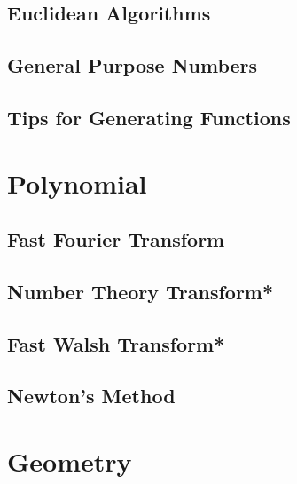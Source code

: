 \subsection{Euclidean Algorithms}

\subsection{General Purpose Numbers}

\subsection{Tips for Generating Functions}


\section{Polynomial}
\subsection{Fast Fourier Transform}

\subsection{Number Theory Transform*} %

\subsection{Fast Walsh Transform*} %

% 
% 
\subsection{Newton's Method}


\section{Geometry}
